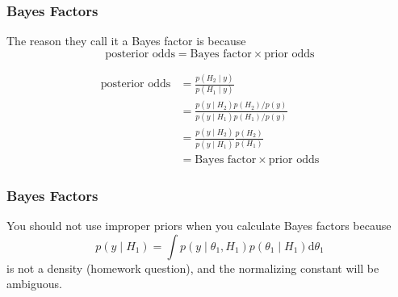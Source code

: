 \documentclass{beamer}
\begin{document}
\begin{frame}
\frametitle{Bayes Factors}

The reason they call it a Bayes factor is because
\[
\text{posterior odds} = \text{Bayes factor} \times \text{prior odds}
\]
\pause

\begin{align*}
\text{posterior odds} &= \frac{p(H_2 \mid y)}{p(H_1 \mid y)} \\
&= \frac{p(y \mid H_2)p(H_2) / p(y)}{p(y \mid H_1)p(H_1) / p(y)} \tag{Bayes rule} \\
&= \frac{p(y \mid H_2)}{p(y \mid H_1)} \frac{p(H_2)}{p(H_1)} \\
&= \text{Bayes factor} \times \text{prior odds}
\end{align*}



\end{frame}


\begin{frame}
\frametitle{Bayes Factors}

You should not use improper priors when you calculate Bayes factors because
\[
p(y \mid H_1) = \int p(y \mid \theta_1, H_1)p(\theta_1 \mid H_1) \text{d}\theta_1
\]
is not a density (homework question), and the normalizing constant will be ambiguous.

\end{frame}
\end{document}
